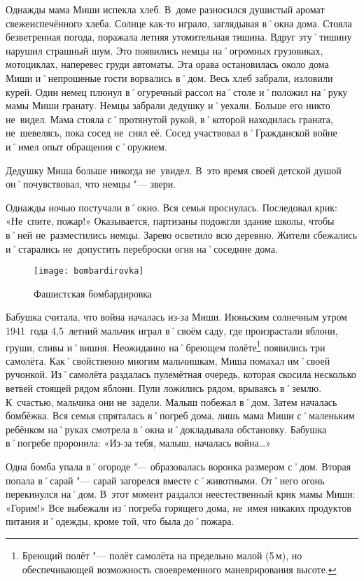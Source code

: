 Однажды мама Миши испекла хлеб. В~доме разносился душистый аромат свежеиспечённого хлеба. Солнце как-то играло, заглядывая в˚окна дома. Стояла безветренная погода, поражала летняя утомительная тишина. Вдруг эту˚тишину нарушил страшный шум. Это появились немцы на˚огромных грузовиках, мотоциклах, наперевес груди автоматы. Эта орава остановилась около дома Миши и˚непрошеные гости ворвались в˚дом. Весь хлеб забрали, изловили курей. Один немец плюнул в˚огуречный рассол на˚столе и˚положил на˚руку мамы Миши гранату. Немцы забрали дедушку и˚уехали. Больше его никто не~видел. Мама стояла с˚протянутой рукой, в˚которой находилась граната, не~шевелясь, пока сосед не~снял её. Сосед участвовал в˚Гражданской войне и˚имел опыт обращения с˚оружием.

Дедушку Миша больше никогда не~увидел. В~это время своей детской душой он˚почувствовал, что немцы "--- звери.

Однажды ночью постучали в˚окно. Вся семья проснулась. Последовал крик: «Не~спите, пожар!» Оказывается, партизаны подожгли здание школы, чтобы в˚ней не~разместились немцы. Зарево осветило всю деревню. Жители сбежались и˚старались не~допустить переброски огня на˚соседние дома.

\begin{wrapfigure}{O}{.4\textwidth}
\centering
\texttt{[image: bombardirovka]}
\caption{Фашистская бомбардировка}
\label{fig:bombardirovka}
\end{wrapfigure}

Бабушка считала, что война началась из-за Миши. Июньским солнечным утром 1941~года 4,5~летний мальчик играл в˚своём саду, где произрастали яблони, груши, сливы и˚вишня. Неожиданно на˚бреющем полёте\footnote{Бреющий полёт "--- полёт самолёта на предельно малой (5\,м), но обеспечивающей возможность своевременного маневрирования высоте.} появились три самолёта. Как˚свойственно многим мальчишкам, Миша помахал им˚своей ручонкой. Из˚самолёта раздалась пулемётная очередь, которая скосила несколько ветвей стоящей рядом яблони. Пули ложились рядом, врываясь в˚землю. К~счастью, мальчика они не~задели. Малыш побежал в˚дом. Затем началась бомбёжка. Вся семья спряталась в˚погреб дома, лишь мама Миши с˚маленьким ребёнком на˚руках смотрела в˚окна и˚докладывала обстановку. Бабушка в˚погребе проронила: «Из-за тебя, малыш, началась война…»

Одна бомба упала в˚огороде "--- образовалась воронка размером с˚дом. Вторая попала в˚сарай "--- сарай загорелся вместе с˚животными. От˚него огонь перекинулся на˚дом. В~этот момент раздался неестественный крик мамы Миши: «Горим!» Все выбежали из˚погреба горящего дома, не~имея никаких продуктов питания и˚одежды, кроме той, что была до˚пожара.

